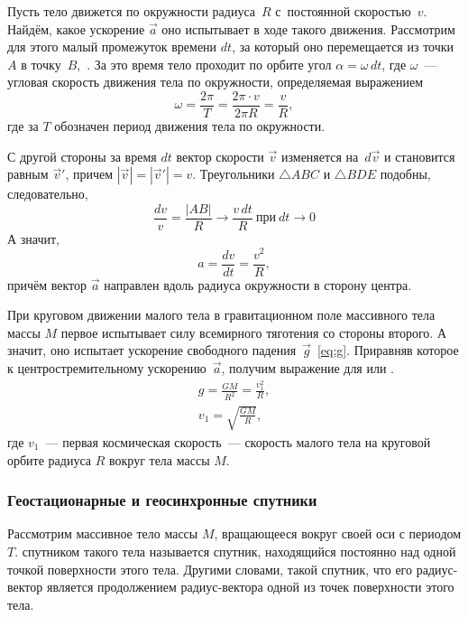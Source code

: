 Пусть тело движется по окружности радиуса~$R$ с~постоянной скоростью~$v$. Найдём, какое ускорение $\vec a$ оно испытывает в ходе такого движения. Рассмотрим для этого малый промежуток времени $dt$, за который оно перемещается из точки~$A$ в точку~$B$,~. За это время тело проходит по орбите угол $\alpha = \omega \, dt$, где $\omega$~--- угловая скорость движения тела по окружности, определяемая выражением
\begin{equation*}
    \omega = \frac{2 \pi}{T} = \frac{ 2\pi \cdot v}{2\pi R} = \frac{v}{R},
\end{equation*}
где за $T$ обозначен период движения тела по окружности.

С другой стороны за время $dt$ вектор скорости $\vec{v}$ изменяется на~$d \vec{v}$ и становится равным $\vec{v}'$, причем $|\vec{v}| = |\vec{v}'| = v$.  Треугольники $\triangle ABC$ и $\triangle BDE$ подобны, следовательно,
\begin{equation*}
    \frac{dv}{v} = \frac{|AB|}{R} \rightarrow \frac{v\,dt}{R}~\text{при}~dt \rightarrow 0
\end{equation*}
 А значит, 
\begin{equation*}
    a = \frac{dv}{dt} = \frac{v^2}{R},
\end{equation*}
причём вектор $\vec{a}$ направлен вдоль радиуса окружности в сторону центра. 

При круговом движении малого тела в гравитационном поле массивного тела массы $M$ первое испытывает силу всемирного тяготения со стороны второго. А значит, оно испытает ускорение свободного падения~$\vec{g}$~\eqref{eq:g}. Приравняв которое к центростремительному ускорению~$\vec{a}$, получим выражение для  или .
\begin{gather}
    g = \frac{G M}{R^2} = \frac{v_1^2}{R},\nonumber\\
    v_1 = \sqrt{\frac{GM}{R}},
\end{gather}
где $v_1$~--- первая космическая скорость~--- скорость малого тела на круговой орбите радиуса $R$ вокруг тела массы $M$.

\subsubsection{Геостационарные и геосинхронные спутники}
    Рассмотрим массивное тело массы $M$, вращающееся вокруг своей оси с периодом $T$.  спутником такого тела называется спутник, находящийся постоянно над одной точкой поверхности этого тела. Другими словами, такой спутник, что его радиус-вектор является продолжением радиус-вектора одной из точек поверхности этого тела. 
    
